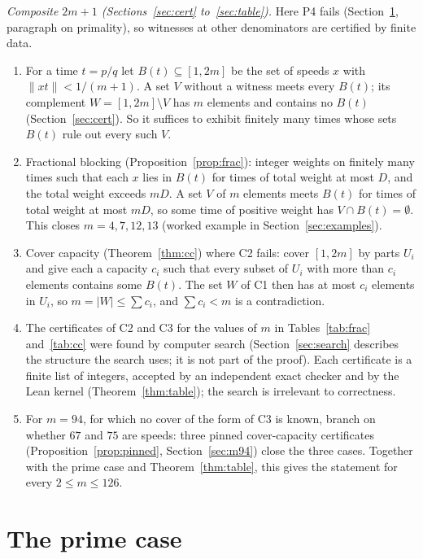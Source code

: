 \documentclass[11pt]{article}
\theoremstyle{remark}
\newcommand{\norm}[1]{\lVert #1\rVert}
\begin{document}
\smallskip\noindent\emph{Composite $2m+1$ (Sections~\ref{sec:cert} to~\ref{sec:table}).} Here P4 fails (Section~\ref{sec:prime}, paragraph on primality), so witnesses at other denominators are certified by finite data.
\begin{enumerate}
\item[C1.] For a time $t=p/q$ let $B(t)\subseteq[1,2m]$ be the set of speeds $x$ with $\norm{xt}<1/(m+1)$. A set $V$ without a witness meets every $B(t)$; its complement $W=[1,2m]\setminus V$ has $m$ elements and contains no $B(t)$ (Section~\ref{sec:cert}). So it suffices to exhibit finitely many times whose sets $B(t)$ rule out every such $V$.
\item[C2.] Fractional blocking (Proposition~\ref{prop:frac}): integer weights on finitely many times such that each $x$ lies in $B(t)$ for times of total weight at most $D$, and the total weight exceeds $mD$. A set $V$ of $m$ elements meets $B(t)$ for times of total weight at most $mD$, so some time of positive weight has $V\cap B(t)=\emptyset$. This closes $m=4,7,12,13$ (worked example in Section~\ref{sec:examples}).
\item[C3.] Cover capacity (Theorem~\ref{thm:cc}) where C2 fails: cover $[1,2m]$ by parts $U_i$ and give each a capacity $c_i$ such that every subset of $U_i$ with more than $c_i$ elements contains some $B(t)$. The set $W$ of C1 then has at most $c_i$ elements in $U_i$, so $m=|W|\le\sum c_i$, and $\sum c_i<m$ is a contradiction.
\item[C4.] The certificates of C2 and C3 for the values of $m$ in Tables~\ref{tab:frac} and~\ref{tab:cc} were found by computer search (Section~\ref{sec:search} describes the structure the search uses; it is not part of the proof). Each certificate is a finite list of integers, accepted by an independent exact checker and by the Lean kernel (Theorem~\ref{thm:table}); the search is irrelevant to correctness.
\item[C5.] For $m=94$, for which no cover of the form of C3 is known, branch on whether $67$ and $75$ are speeds: three pinned cover-capacity certificates (Proposition~\ref{prop:pinned}, Section~\ref{sec:m94}) close the three cases. Together with the prime case and Theorem~\ref{thm:table}, this gives the statement for every $2\le m\le126$.
\end{enumerate}

\section{The prime case}\label{sec:prime}
\end{document}
